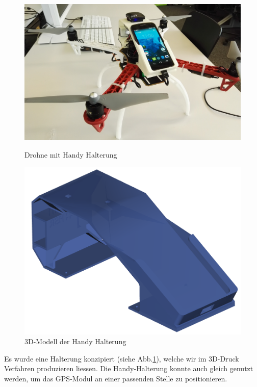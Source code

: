 \begin{figure}[H]
	\centering
	\begin{minipage}[b]{0.4\textwidth}
		\includegraphics[width=\textwidth]{images/hardware/drone-with-handy.jpg}
		\caption{Drohne mit Handy Halterung}
		\label{fig:prototyp-3}
	\end{minipage}
	\hfill
	\begin{minipage}[b]{0.4\textwidth}
		\includegraphics[width=\textwidth]{images/hardware/case-model.png}
		\caption{3D-Modell der Handy Halterung}
		\label{fig:case-model}
	\end{minipage}
\end{figure}

Es wurde eine Halterung konzipiert (siehe Abb.\ref{fig:case-model}), welche wir im 3D-Druck Verfahren produzieren liessen.
Die Handy-Halterung konnte auch gleich genutzt werden, um das GPS-Modul an einer passenden Stelle zu positionieren. 

